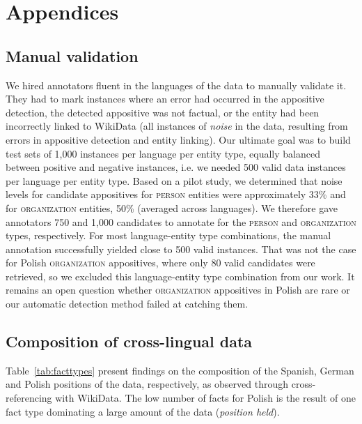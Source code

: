 \appendix

\section{Appendices}

\subsection{Manual validation} 
\label{manual}
We hired annotators fluent in the languages of the data to manually validate it. They had to mark instances where an error had occurred in the appositive detection, the detected appositive was not factual, or the entity had been incorrectly linked to WikiData (all instances of \textit{noise} in the data, resulting from errors in appositive detection and entity linking). Our ultimate goal was to build test sets of 1,000 instances per language per entity type, equally balanced between positive and negative instances, i.e. we needed 500 valid data instances per language per entity type. Based on a pilot study, we determined that noise levels for candidate appositives for \textsc{person} entities were approximately 33\% and for \textsc{organization} entities, 50\% (averaged across languages). We therefore gave annotators 750 and 1,000 candidates to annotate for the \textsc{person} and \textsc{organization} types, respectively. For most language-entity type combinations, the manual annotation successfully yielded close to 500 valid instances. That was not the case for Polish \textsc{organization} appositives, where only 80 valid candidates were retrieved, so we excluded this language-entity type combination from our work. It remains an open question whether \textsc{organization} appositives in Polish are rare or our automatic detection method failed at catching them. 

\subsection{Composition of cross-lingual data}
\label{composition}
Table~\ref{tab:facttypes} present findings on the composition of the Spanish, German and Polish positions of the data, respectively, as observed through cross-referencing with WikiData. The low number of facts for Polish is the result of one fact type dominating a large amount of the data (\textit{position held}).

